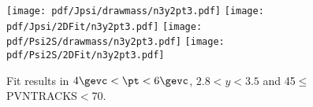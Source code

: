 \begin{figure}[H]
\begin{center}
\texttt{[image: pdf/Jpsi/drawmass/n3y2pt3.pdf]}
\texttt{[image: pdf/Jpsi/2DFit/n3y2pt3.pdf]}
\vspace*{-0.5cm}
\texttt{[image: pdf/Psi2S/drawmass/n3y2pt3.pdf]}
\texttt{[image: pdf/Psi2S/2DFit/n3y2pt3.pdf]}
\vspace*{-0.5cm}
\end{center}
\caption{Fit results in $4\gevc<\pt<6\gevc$, $2.8<y<3.5$ and 45$\leq$PVNTRACKS$<$70.}
\label{Fitn3y2pt3}
\end{figure}

